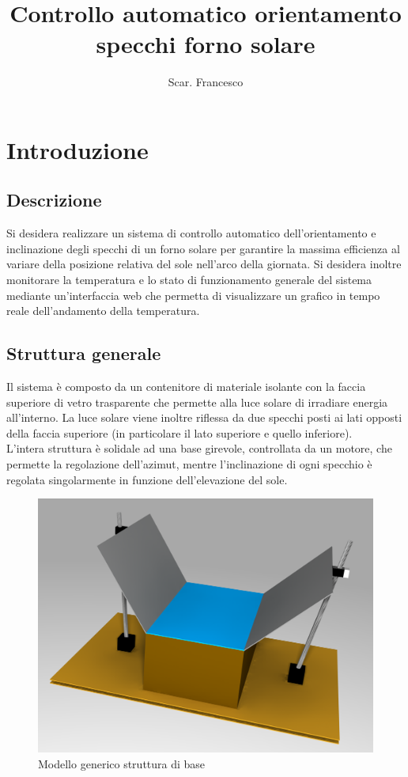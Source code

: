 \documentclass[12pt]{article}
\title{\textbf{Controllo automatico orientamento specchi forno solare}}
\author{Scar. Francesco}
\date{}
\begin{document}
\maketitle

\tableofcontents{}


\newpage


\section{Introduzione}
    \subsection{Descrizione}
    Si desidera realizzare un sistema di controllo automatico dell'orientamento e inclinazione degli specchi di un forno solare per garantire la massima efficienza al variare della posizione relativa del sole nell'arco della giornata.
    Si desidera inoltre monitorare la temperatura e lo stato di funzionamento generale del sistema mediante un'interfaccia web che permetta di visualizzare un grafico in tempo reale dell'andamento della temperatura.


    \subsection{Struttura generale}
    Il sistema è composto da un contenitore di materiale isolante con la faccia superiore di vetro trasparente che permette alla luce solare di irradiare energia all'interno. La luce solare viene inoltre riflessa da due specchi posti ai lati opposti della faccia superiore (in particolare il lato superiore e quello inferiore).\\
    L'intera struttura è solidale ad una base girevole, controllata da un motore, che permette la regolazione dell'azimut, mentre l'inclinazione di ogni specchio è regolata singolarmente in funzione dell'elevazione del sole.
    
    \begin{figure}[h]
    \centering
        \includegraphics[width=\textwidth-100pt]{Draws/3D_render_cut.png}
        \caption{Modello generico struttura di base}
    \end{figure}
    
\end{document}
